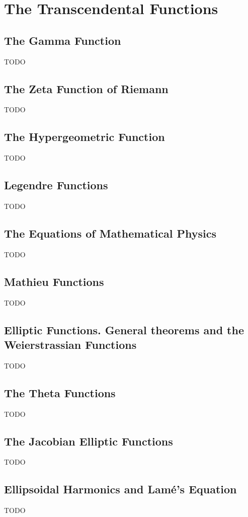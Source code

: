 \documentclass{book}
\numberwithin{equation}{subsection}
\theoremstyle{remark}
\numberwithin{wandwexample}{subsubsection}
\newcommand{\Lame}{Lam\'e}
\begin{document}
\part{The Transcendental Functions}
\chapter{The Gamma Function} TODO
\chapter{The Zeta Function of Riemann} TODO
\chapter{The Hypergeometric Function} TODO
\chapter{Legendre Functions} TODO


\chapter{The Equations of Mathematical Physics} TODO
\chapter{Mathieu Functions} TODO
\chapter{Elliptic Functions. General theorems and the Weierstrassian
Functions} TODO
\chapter{The Theta Functions} TODO
\chapter{The Jacobian Elliptic Functions} TODO
\chapter{Ellipsoidal Harmonics and \Lame's Equation} TODO
\end{document}
